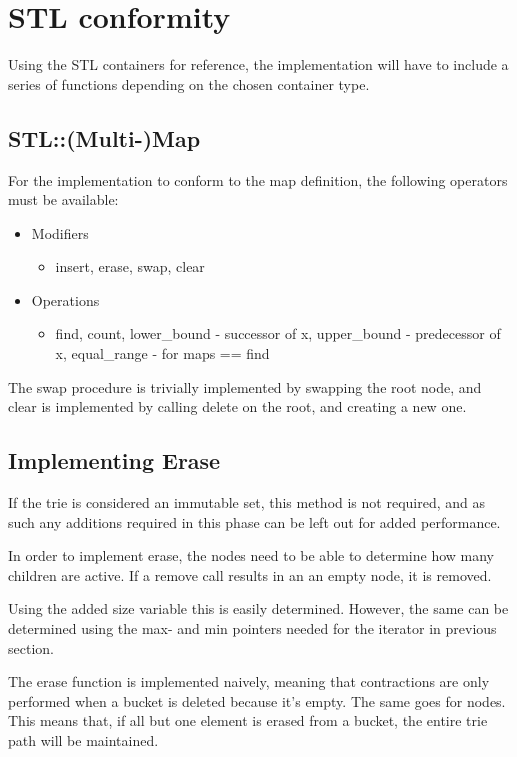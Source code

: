 \clearpage
\section{STL conformity}
Using the STL containers for reference, the implementation will have to include
a series of functions depending on the chosen container type.

\subsection{STL::(Multi-)Map}
For the implementation to conform to the map definition, the following operators
must be available:
\begin{itemize}
    \item Modifiers
        \begin{itemize}
        \item insert, erase, swap, clear
        \end{itemize}
    \item Operations
        \begin{itemize}
        \item find, count, lower\_bound - successor of x,
            upper\_bound - predecessor of x, equal\_range - for maps == find
        \end{itemize}
\end{itemize}
The swap procedure is trivially implemented by swapping the root node, and clear
is implemented by calling delete on the root, and creating a new one.

\subsection{Implementing Erase}
If the trie is considered an immutable set, this method is not required, and as such
any additions required in this phase can be left out for added performance.

In order to implement {\keyword erase}, the nodes need to be able to determine how many
children are active. If a remove call results in an an empty node, it is removed.

Using the added {\keyword size} variable this is easily determined. However,
the same can be determined using the {\keyword max}- and {\keyword min}
pointers needed for the {\keyword iterator} in previous section.

The {\keyword erase} function is implemented naively, meaning that contractions
are only performed when a bucket is deleted because it's empty. The same goes
for nodes. This means that, if all but one element is erased from a bucket,
the entire trie path will be maintained.

